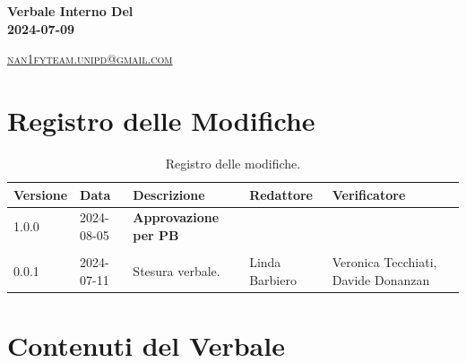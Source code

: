 \documentclass[8pt]{article}
\begin{document}
\begin{titlepage}
\begin{minipage}[t]{0.47\textwidth}
{		}
		\vspace{4mm}\vspace{4mm}
	\end{minipage}
	\vspace{4cm}
	\begin{center}
		\begin{flushright}
			{\fontsize{30pt}{52pt}\selectfont \textbf{Verbale Interno Del\\2024-07-09\\}} %
		\end{flushright}
		\vspace{3cm}
	\end{center}
	\vspace{8.5 cm}
	{\small \textsc{\href{mailto: nan1fyteam.unipd@gmail.com}{nan1fyteam.unipd@gmail.com}}}
\end{titlepage}
\pagestyle{mystyle}
\section*{Registro delle Modifiche}
\begin{table}[ht!]	
	\centering
	\begin{tabular}{p{1.2cm} p{2cm} p{5cm} p{3cm} p{3cm}}
		\toprule
		\textbf{Versione}& \textbf{Data} & \textbf{Descrizione} & \textbf{Redattore} & \textbf{Verificatore} \\
		\midrule
			1.0.0 & 2024-08-05 & \textbf{Approvazione per PB} & & \\\\
			0.0.1 & 2024-07-11 & Stesura verbale. & Linda Barbiero & Veronica Tecchiati, Davide Donanzan
 			\\ %

		\bottomrule
	\end{tabular}
	\caption{Registro delle modifiche.}
	\label{table:Registro delle modifiche}
\end{table}
\newpage
\tableofcontents
\clearpage
\newpage
\justifying
\section{Contenuti del Verbale}
\end{document}
